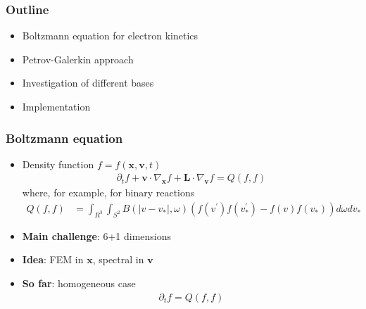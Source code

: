 \documentclass[mathserif, aspectratio=169]{beamer}
\newcommand{\vect}[1]{\boldsymbol{#1}}
\begin{document}
\begin{frame}
\frametitle{Outline}
\begin{itemize}
  \item Boltzmann equation for electron kinetics
  \item Petrov-Galerkin approach
  \item Investigation of different bases
  \item Implementation 
\end{itemize}
\end{frame}

\begin{frame}
\frametitle{Boltzmann equation}
%
\begin{itemize}
\item Density function $f = f(\vect{x}, \vect{v}, t)$
\small
\begin{align*}
\partial_t f + \vect{v}\cdot \nabla_{\vect{x}} f  + \vect{L} \cdot \nabla_{\vect{v }}f = Q(f,f)
\end{align*}
where, for example, for binary reactions
\begin{align*}
Q(f,f) &= \int_{R^3}\int_{S^2} B(|v-v_*|,\omega) 
\left( f(v^\prime)f(v_*^\prime) - f(v)f(v_*) \right) d\omega dv_*
\end{align*}
\item \textbf{Main challenge}: 6+1 dimensions
\item \textbf{Idea}: FEM in $\vect{x}$, spectral in $\vect{v}$
\item \textbf{So far}: homogeneous case
\begin{align*}
\partial_t f = Q(f,f)
\end{align*}
\end{itemize}
%
\end{frame}
\end{document}
